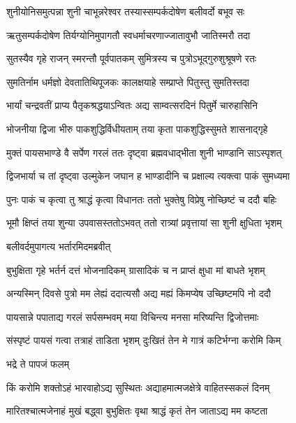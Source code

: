 \twolineshloka
{शुनीयोनिसमुत्पन्ना शुनी चाभून्नरेश्वर}
{तस्यास्सम्पर्कदोषेण बलीवर्दो बभूव सः} %

\twolineshloka
{ऋतुसम्पर्कदोषेण तिर्यग्योनिमुपागतौ}
{स्वधर्माचरणाज्जातावुभौ जातिस्मरौ तदा} %

\twolineshloka
{सुतस्यैव गृहे राजन् स्मरन्तौ पूर्वपातकम्}
{सुमित्रस्य च पुत्रोऽभूद्गुरुशुश्रूषणे रतः} %

\twolineshloka
{सुमतिर्नाम धर्मज्ञो देवतातिथिपूजकः}
{कालक्षयाहे सम्प्राप्ते पितुस्तु सुमतिस्तदा} %

\twolineshloka
{भार्यां चन्द्रवतीं प्राप्य पैतृकश्रद्धयाऽन्वितः}
{अद्य साम्वत्सरदिनं पितुर्मे चारुहासिनि} %

\twolineshloka
{भोजनीया द्विजा भीरु पाकशुद्धिर्विधीयताम्}
{तया कृता पाकशुद्धिस्सुमते शासनाद्गृहे} %

\twolineshloka
{मुक्तं पायसभाण्डे वै सर्पेण गरलं ततः}
{दृष्ट्वा ब्रह्मवधाद्भीता शुनी भाण्डानि साऽस्पृशत्} %

\twolineshloka
{द्विजभार्या च तां दृष्ट्वा उल्मुकेन जघान ह}
{भाण्डादीनि च प्रक्षाल्य त्यक्त्वा पाकं सुमध्यमा} %

\twolineshloka
{पुनः पाकं च कृत्वा तु श्राद्धं कृत्वा विधानतः}
{ततो भुक्तेषु विप्रेषु नोच्छिष्टं च ददौ बहिः} %

\twolineshloka
{भूमौ क्षिप्तं तया शुन्या उपवासस्ततोऽभवत्}
{ततो रात्र्यां प्रवृत्तायां सा शुनी क्षुधिता भृशम्} %

\onelineshloka
{बलीवर्दमुपागत्य भर्तारमिदमब्रवीत्} %


\twolineshloka
{बुभुक्षिता गृहे भर्तर्न दत्तं भोजनादिकम्}
{ग्रासादिकं च न प्राप्तं क्षुधा मां बाधते भृशम्} %

\twolineshloka
{अन्यस्मिन् दिवसे पुत्रो मम लेह्यं ददात्यसौ}
{अद्य मह्यं किमप्येष उच्छिष्टमपि नो ददौ} %

\twolineshloka
{पायसान्ने पपाताद्य गरलं सर्पसम्भवम्}
{मया विचिन्त्य मनसा मरिष्यन्ति द्विजोत्तमाः} %

\twolineshloka
{संस्पृष्टं पायसं गत्वा तत्राहं ताडिता भृशम्}
{दुःखितं तेन मे गात्रं कटिर्भग्ना करोमि किम्} %


\onelineshloka
{भद्रे ते पापजं फलम्} %

\twolineshloka
{किं करोमि शक्तोऽहं भारवाहोऽद्य सुस्थितः}
{अद्याहमात्मजक्षेत्रे वाहितस्सकलं दिनम्} %

\twolineshloka
{मारितश्चात्मजेनाहं मुखं बद्ध्वा बुभुक्षितः}
{वृथा श्राद्धं कृतं तेन जाताऽद्य मम कष्टता} %


